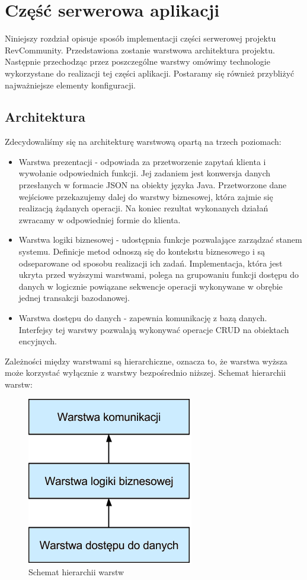 \chapter{Część serwerowa aplikacji}

Niniejszy rozdział opisuje sposób implementacji części serwerowej projektu RevCommunity. Przedstawiona zostanie warstwowa architektura projektu. Następnie przechodząc przez poszczególne warstwy omówimy technologie wykorzystane do realizacji tej części aplikacji. Postaramy się również przybliżyć najważniejsze elementy konfiguracji.

\section{Architektura}
Zdecydowaliśmy się na architekturę warstwową opartą na trzech poziomach:

\begin{itemize}
\item Warstwa prezentacji - odpowiada za przetworzenie zapytań klienta i wywołanie odpowiednich funkcji. Jej zadaniem jest konwersja danych przesłanych w formacie JSON na obiekty języka Java. Przetworzone dane wejściowe przekazujemy dalej do warstwy biznesowej, która zajmie się realizacją żądanych operacji. Na koniec rezultat wykonanych działań zwracamy w odpowiedniej formie do klienta.
\item Warstwa logiki biznesowej - udostępnia funkcje pozwalające zarządzać stanem systemu. Definicje metod odnoszą się do kontekstu biznesowego i są odseparowane od sposobu realizacji ich zadań. Implementacja, która jest ukryta przed wyższymi warstwami, polega na grupowaniu funkcji dostępu do danych w logicznie powiązane sekwencje operacji wykonywane w obrębie jednej transakcji bazodanowej.
\item Warstwa dostępu do danych - zapewnia komunikację z bazą danych. Interfejsy tej warstwy pozwalają wykonywać operacje CRUD na obiektach encyjnych.
\end{itemize}

Zależności między warstwami są hierarchiczne, oznacza to, że warstwa wyższa może korzystać wyłącznie z warstwy bezpośrednio niższej. 
Schemat hierarchii warstw:

\begin{figure}
	\centering
	\includegraphics[scale=1]{images/warstwy_serwer.png}
	\caption{Schemat hierarchii warstw}
\end{figure}


